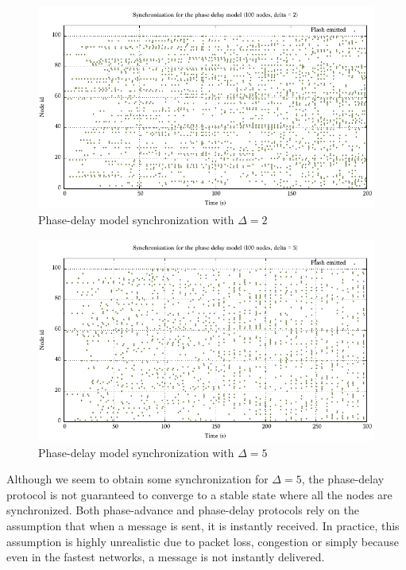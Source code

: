 \documentclass[a4paper, 11pt]{article}
\theoremstyle{plain}
\theoremstyle{definition}
\begin{document}
     \begin{figure}[h]
       \centering
       \includegraphics[width=\textwidth]{../Plots/Firefly-pd-100nodes-2-4.pdf}
       \caption{Phase-delay model synchronization with $\Delta = 2$}
       \label{fig:pd-sync-d2}
     \end{figure}

      \begin{figure}[h]
       \centering
       \includegraphics[width=\textwidth]{../Plots/Firefly-pd-100nodes-5-5.pdf}
       \caption{Phase-delay model synchronization with $\Delta = 5$}
       \label{fig:pd-sync-d5}
     \end{figure}
     
     Although we seem to obtain some synchronization for $\Delta = 5$, the phase-delay protocol is not
     guaranteed to converge to a stable state where all the nodes are synchronized. Both phase-advance and
     phase-delay protocols rely on the assumption that when a message is sent, it is instantly received. In
     practice, this assumption is highly unrealistic due to packet loss, congestion or simply because even in the
     fastest networks, a message is not instantly delivered.
\end{document}
